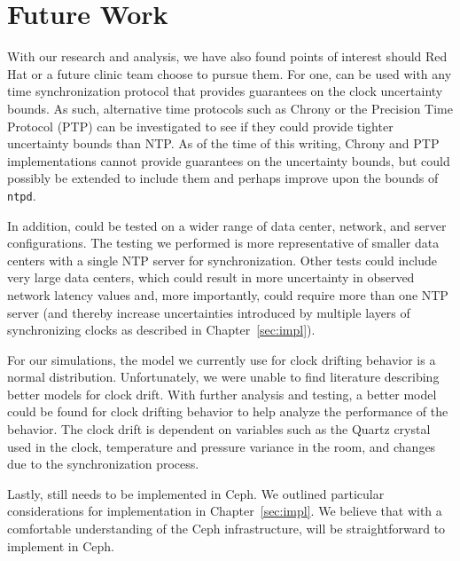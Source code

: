 \chapter{Future Work}
\label{sec:future}

With our research and analysis, we have also found points of interest
should Red Hat or a future clinic team choose to pursue them. For one,
\alg can be used with any time synchronization
protocol that provides guarantees on the clock uncertainty bounds. As
such, alternative time protocols such as Chrony or the Precision Time
Protocol (PTP) can be investigated to see if they could provide
tighter uncertainty bounds than NTP. As of the time of this writing,
Chrony and PTP implementations cannot provide guarantees on the
uncertainty bounds, but could possibly be extended to include them and
perhaps improve upon the bounds of \texttt{ntpd}.

In addition, \alg could be tested on a wider range
of data center, network, and server configurations.
The testing we performed is more representative of smaller data
centers with a single NTP server for synchronization. Other tests
could include very large data centers, which could result in more uncertainty 
in observed network latency values and, more importantly, could require 
more than one NTP server (and thereby increase uncertainties introduced by
multiple layers of synchronizing clocks as described in Chapter~\ref{sec:impl}).

For our simulations, the model we currently use for clock drifting
behavior is a normal distribution. Unfortunately, we were
unable to find literature describing better models for clock drift. 
With further analysis and testing, a better model could be
found for clock drifting behavior to help analyze the performance of
the behavior. The clock drift is dependent on
variables such as the Quartz crystal used in the clock, temperature and 
pressure variance in the room, and changes due to the synchronization process.



Lastly, \alg still needs to be implemented in 
Ceph. We outlined particular considerations for implementation
in Chapter~\ref{sec:impl}. We believe that with a comfortable
understanding of the Ceph infrastructure, \alg will be straightforward 
to implement in Ceph.
